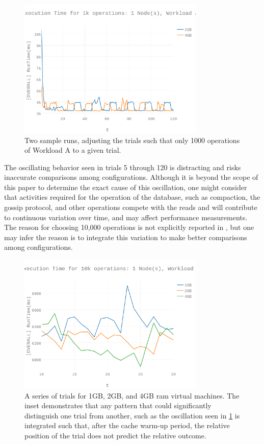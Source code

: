 \begin{figure}[h]
\includegraphics[width=3.5in]{Figures/figures-wla_fig2.pdf}

\caption{Two sample runs, adjusting the trials such that only 1000 operations of Workload A to a given trial.}

\label{fig:fig02}
\end{figure}

The oscillating behavior seen in trials 5 through 120 is distracting and risks inaccurate comparisons among configurations.  Although it is beyond the scope of this paper to determine the exact cause of this oscillation, one might consider that activities required for the operation of the database, such as compaction, the gossip protocol, and other operations compete with the reads and will contribute to continuous variation over time, and may affect performance measurements.  The reason for choosing 10,000 operations is not explicitly reported in \cite{Abramova2014}, but one may infer the reason is to integrate this variation to make better comparisons among configurations.  

\begin{figure}[h]
\includegraphics[width=3.5in]{Figures/figures-wla_fig3.pdf}

\caption{A series of trials for 1GB, 2GB, and 4GB \gls{ram} virtual machines.  The inset demonstrates that any pattern that could significantly distinguish one trial from another, such as the oscillation seen in \ref{fig:fig02} is integrated such that, after the cache warm-up period, the relative position of the trial does not predict the relative outcome.}

\label{fig:fig03}
\end{figure}

